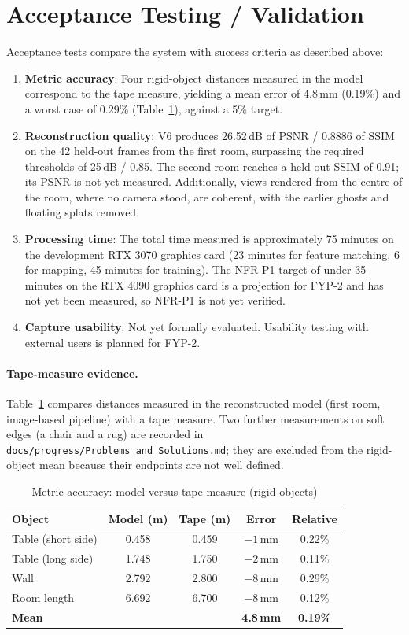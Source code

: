 \section{Acceptance Testing / Validation}
Acceptance tests compare the system with success criteria as described above:

\begin{enumerate}
    \item \textbf{Metric accuracy}: Four rigid-object distances measured in the model correspond to the tape measure, yielding a mean error of 4.8\,mm (0.19\%) and a worst case of 0.29\% (Table~\ref{tab:tape}), against a 5\% target.
    \item \textbf{Reconstruction quality}: V6 produces 26.52\,dB of PSNR / 0.8886 of SSIM on the 42 held-out frames from the first room, surpassing the required thresholds of 25\,dB / 0.85. The second room reaches a held-out SSIM of 0.91; its PSNR is not yet measured. Additionally, views rendered from the centre of the room, where no camera stood, are coherent, with the earlier ghosts and floating splats removed.
    \item \textbf{Processing time}: The total time measured is approximately 75 minutes on the development RTX 3070 graphics card (23 minutes for feature matching, 6 for mapping, 45 minutes for training). The NFR-P1 target of under 35 minutes on the RTX 4090 graphics card is a projection for FYP-2 and has not yet been measured, so NFR-P1 is not yet verified.
    \item \textbf{Capture usability}: Not yet formally evaluated. Usability testing with external users is planned for FYP-2.
\end{enumerate}


\paragraph{Tape-measure evidence.} Table~\ref{tab:tape} compares distances measured in the reconstructed model (first room, image-based pipeline) with a tape measure. Two further measurements on soft edges (a chair and a rug) are recorded in \texttt{docs/progress/Problems\_and\_Solutions.md}; they are excluded from the rigid-object mean because their endpoints are not well defined.

\begin{table}[htbp]
\centering
\caption{Metric accuracy: model versus tape measure (rigid objects)}
\label{tab:tape}
\begin{tabular}{p{3.6cm}cccc}
\toprule
\textbf{Object} & \textbf{Model (m)} & \textbf{Tape (m)} & \textbf{Error} & \textbf{Relative} \\
\midrule
Table (short side) & 0.458 & 0.459 & $-1$\,mm & 0.22\% \\
Table (long side) & 1.748 & 1.750 & $-2$\,mm & 0.11\% \\
Wall & 2.792 & 2.800 & $-8$\,mm & 0.29\% \\
Room length & 6.692 & 6.700 & $-8$\,mm & 0.12\% \\
\midrule
\textbf{Mean} & & & \textbf{4.8\,mm} & \textbf{0.19\%} \\
\bottomrule
\end{tabular}
\end{table}

